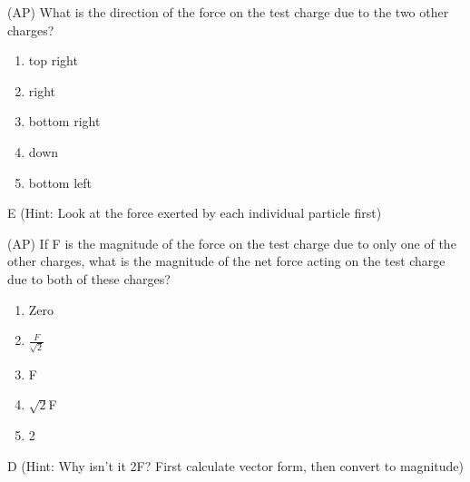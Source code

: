 
\begin{question}
(AP) What is the direction of the force on the test charge due to the two other charges?
\begin{multicols}{5}
\begin{enumerate}[label=(\alph*)]
    \item top right
    \item right
    \item bottom right
    \item down
    \item bottom left
\end{enumerate}
\end{multicols}

\end{question}

\begin{solution}
E (Hint: Look at the force exerted by each individual particle first)
\end{solution}


\begin{question}
(AP) If F is the magnitude of the force on the test charge due to only one of the other charges, what is the magnitude of the net force acting on the test charge due to both of these charges?
\begin{multicols}{5}
\begin{enumerate}[label=(\alph*)]
    \item Zero
    \item $\frac{F}{\sqrt{2}}$
    \item F
    \item $\sqrt{2}$F
    \item 2
\end{enumerate}
\end{multicols}

\end{question}

\begin{solution}
D (Hint: Why isn't it 2F? First calculate vector form, then convert to magnitude)
\end{solution}



